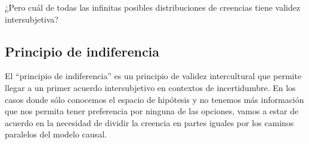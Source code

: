 \documentclass[a4paper,10pt]{book}
\theoremstyle{definition}
\begin{document}

¿Pero cu\'al de todas las infinitas posibles distribuciones de creencias tiene validez intersubjetiva?

\subsection{Principio de indiferencia}\label{sec:principio_indiferencia}

El ``principio de indiferencia'' es un principio de validez intercultural que permite llegar a un primer acuerdo intersubjetivo en contextos de incertidumbre.
%
En los casos donde s\'olo conocemos el espacio de hip\'otesis y no tenemos m\'as informaci\'on que nos permita tener preferencia por ninguna de las opciones, vamos a estar de acuerdo en la necesidad de dividir la creencia en partes iguales por los caminos paralelos del modelo causal.
%
\end{document}
